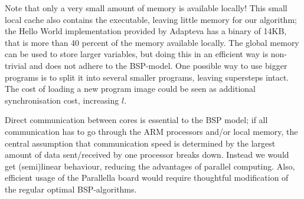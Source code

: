 \documentclass[fleqn]{article}
\renewcommand{\(}{\left(}
\renewcommand{\)}{\right)}
\begin{document}
Note that only a very small amount of memory is available locally! This small local cache also contains the executable, leaving little memory for our algorithm; the Hello World implementation provided by Adapteva has a binary of 14KB, that is more than 40 percent of the memory available locally. The global memory can be used to store larger variables, but doing this in an efficient way is non-trivial and does not adhere to the BSP-model. One possible way to use bigger programs is to split it into several smaller programs, leaving supersteps intact. The cost of loading a new program image could be seen as additional synchronisation cost, increasing $l$.

Direct communication between cores is essential to the BSP model; if all communication has to go through the ARM processors and/or local memory, the central assumption that communication speed is determined by the largest amount of data sent/received by one processor breaks down. Instead we would get (semi)linear behaviour, reducing the advantages of parallel computing. Also, efficient usage of the Parallella board would require thoughtful modification of the regular optimal BSP-algorithms. 
\end{document}
